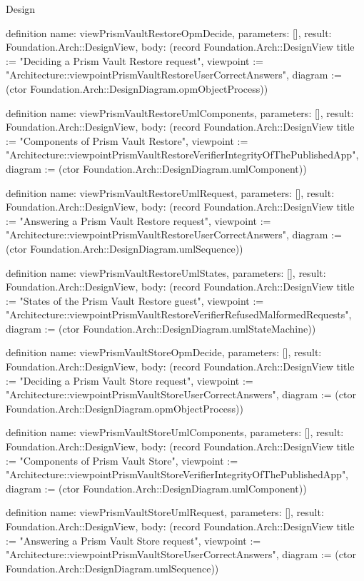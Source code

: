 \begin{lexlean}{Design}
\begin{semanticmodule}
definition{
  name: viewPrismVaultRestoreOpmDecide,
  parameters: [],
  result: Foundation.Arch::DesignView,
  body: (record Foundation.Arch::DesignView {title := "Deciding a Prism Vault Restore request", viewpoint := "Architecture::viewpointPrismVaultRestoreUserCorrectAnswers", diagram := (ctor Foundation.Arch::DesignDiagram.opmObjectProcess)})
}

definition{
  name: viewPrismVaultRestoreUmlComponents,
  parameters: [],
  result: Foundation.Arch::DesignView,
  body: (record Foundation.Arch::DesignView {title := "Components of Prism Vault Restore", viewpoint := "Architecture::viewpointPrismVaultRestoreVerifierIntegrityOfThePublishedApp", diagram := (ctor Foundation.Arch::DesignDiagram.umlComponent)})
}

definition{
  name: viewPrismVaultRestoreUmlRequest,
  parameters: [],
  result: Foundation.Arch::DesignView,
  body: (record Foundation.Arch::DesignView {title := "Answering a Prism Vault Restore request", viewpoint := "Architecture::viewpointPrismVaultRestoreUserCorrectAnswers", diagram := (ctor Foundation.Arch::DesignDiagram.umlSequence)})
}

definition{
  name: viewPrismVaultRestoreUmlStates,
  parameters: [],
  result: Foundation.Arch::DesignView,
  body: (record Foundation.Arch::DesignView {title := "States of the Prism Vault Restore guest", viewpoint := "Architecture::viewpointPrismVaultRestoreVerifierRefusedMalformedRequests", diagram := (ctor Foundation.Arch::DesignDiagram.umlStateMachine)})
}

definition{
  name: viewPrismVaultStoreOpmDecide,
  parameters: [],
  result: Foundation.Arch::DesignView,
  body: (record Foundation.Arch::DesignView {title := "Deciding a Prism Vault Store request", viewpoint := "Architecture::viewpointPrismVaultStoreUserCorrectAnswers", diagram := (ctor Foundation.Arch::DesignDiagram.opmObjectProcess)})
}

definition{
  name: viewPrismVaultStoreUmlComponents,
  parameters: [],
  result: Foundation.Arch::DesignView,
  body: (record Foundation.Arch::DesignView {title := "Components of Prism Vault Store", viewpoint := "Architecture::viewpointPrismVaultStoreVerifierIntegrityOfThePublishedApp", diagram := (ctor Foundation.Arch::DesignDiagram.umlComponent)})
}

definition{
  name: viewPrismVaultStoreUmlRequest,
  parameters: [],
  result: Foundation.Arch::DesignView,
  body: (record Foundation.Arch::DesignView {title := "Answering a Prism Vault Store request", viewpoint := "Architecture::viewpointPrismVaultStoreUserCorrectAnswers", diagram := (ctor Foundation.Arch::DesignDiagram.umlSequence)})
}


\end{semanticmodule}
\end{lexlean}
